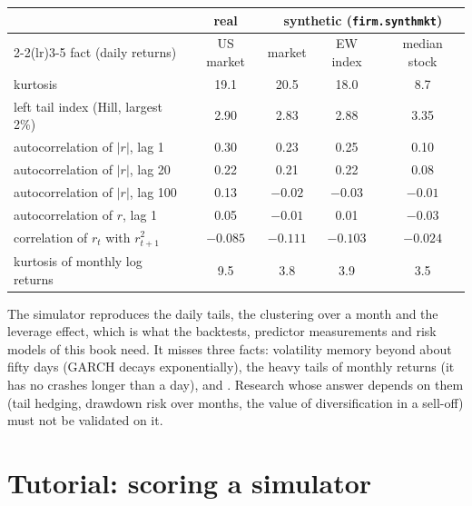 \begin{center}
\small
\begin{tabular}{lcccc}
\toprule
& real & \multicolumn{3}{c}{synthetic (\texttt{firm.synthmkt})} \\
\cmidrule(lr){2-2}\cmidrule(lr){3-5}
fact (daily returns) & US market & market & EW index & median stock \\
\midrule
kurtosis & 19.1 & 20.5 & 18.0 & 8.7 \\
left tail index (Hill, largest 2\%) & 2.90 & 2.83 & 2.88 & 3.35 \\
autocorrelation of $|r|$, lag 1 & 0.30 & 0.23 & 0.25 & 0.10 \\
autocorrelation of $|r|$, lag 20 & 0.22 & 0.21 & 0.22 & 0.08 \\
autocorrelation of $|r|$, lag 100 & 0.13 & $-0.02$ & $-0.03$ & $-0.01$ \\
autocorrelation of $r$, lag 1 & 0.05 & $-0.01$ & 0.01 & $-0.03$ \\
correlation of $r_t$ with $r^2_{t+1}$ & $-0.085$ & $-0.111$ & $-0.103$ & $-0.024$ \\
kurtosis of monthly log returns & 9.5 & 3.8 & 3.9 & 3.5 \\
\bottomrule
\end{tabular}
\end{center}

\begin{remark}\label{rem:rs:stylised-facts-of-returns:scorecard}
The simulator reproduces the daily tails, the clustering over a month and the leverage effect, which is what the backtests,
predictor measurements and risk models of this book need. It misses three facts: volatility memory beyond about fifty days (GARCH
decays exponentially), the heavy tails of monthly returns (it has no crashes longer than a day), and . Research
whose answer depends on them (tail hedging, drawdown risk over months, the value of diversification in a sell-off) must not be
validated on it.
\end{remark}

\section{Tutorial: scoring a simulator}\label{tut:rs:stylised-facts-of-returns:scorecard}

